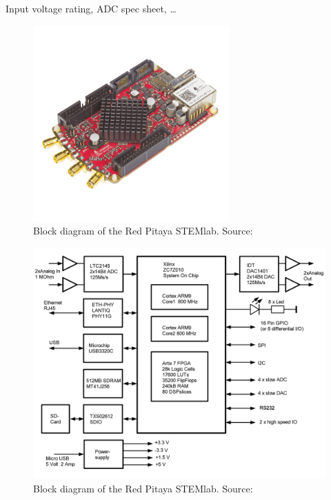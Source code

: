 \cite{bucher:kuery}

Input voltage rating, ADC spec sheet, \ldots

\begin{figure}
    \centering
    \includegraphics[width=0.67\textwidth]{images/stl125/stemlab125-14-photo.png}
    \caption{Block diagram of the Red Pitaya STEMlab. Source:~\cite{pita:elektor:starterkit}}
    \label{fig:stl125:photo}
\end{figure}

\begin{figure}
    \centering
    \includegraphics[width=\textwidth]{images/stl125/stemlab125.png}
    \caption{Block diagram of the Red Pitaya STEMlab. Source:~\cite{pita:ossmann}}
    \label{fig:stl125:block_diagram}
\end{figure}

